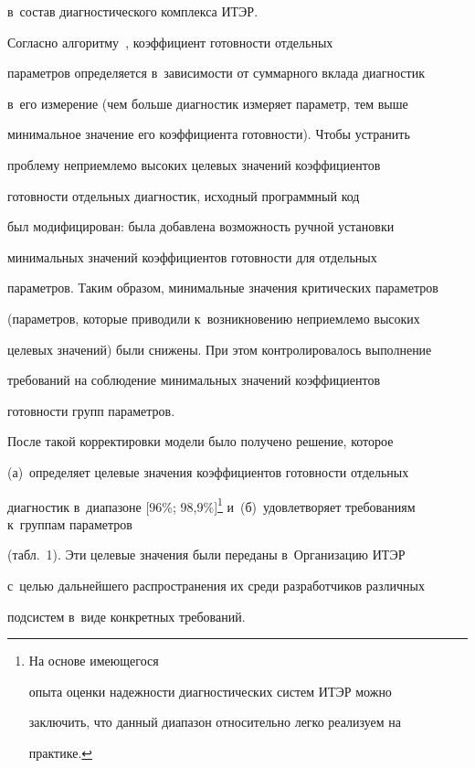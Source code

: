 в~состав диагностического комплекса ИТЭР. 





Согласно алгоритму~\cite{3-kn}, коэффициент готовности отдельных 


параметров определяется в~зависимости от суммарного вклада диагностик 


в~его измерение (чем больше диагностик измеряет параметр, тем выше 


минимальное значение его коэффициента готовности). Чтобы устранить 


проблему неприемлемо высоких целевых значений коэффициентов 


го\-тов\-ности отдельных диагностик, исходный программный код~\cite{8-kn} 


был модифицирован: была до\-бав\-ле\-на воз\-мож\-ность ручной установки 


минимальных значений коэффициентов го\-тов\-ности для отдельных 


па\-ра\-мет\-ров. Таким образом, минимальные значения критических па\-ра\-мет\-ров 


(па\-ра\-мет\-ров, которые приводили к~возникновению неприемлемо высоких 


целевых значений) были снижены. При этом контролировалось выполнение 


требований на соблюдение минимальных значений коэффициентов 


готовности групп па\-ра\-мет\-ров. 





После такой корректировки модели было получено решение, которое 


(а)~определяет целевые значения коэффициентов го\-тов\-ности отдельных 


диагностик в~диапазоне [96\%; 98,9\%]\footnote{На основе имеющегося 


опыта оценки на\-деж\-ности диагностических сис\-тем ИТЭР мож\-но 


заключить, что данный диапазон относительно легко реализуем на 


практике.} и~(б)~удовлетворяет требованиям к~группам па\-ра\-мет\-ров 


(табл.~1). Эти целевые значения были переданы в~Организацию ИТЭР 


с~\mbox{целью} дальнейшего распространения их среди разработчиков различных 


под\-сис\-тем в~виде конкретных требований. 





